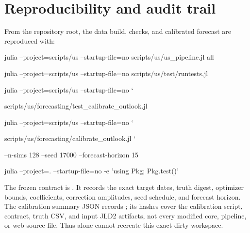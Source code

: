 \documentclass[10pt]{article}
\begin{document}
\section{Reproducibility and audit trail}

From the repository root, the data build, checks, and calibrated forecast are
reproduced with:

\begin{tcolorbox}[colback=navy!3,colframe=navy!35,boxrule=0.5pt]
\small\ttfamily
julia --project=scripts/us --startup-file=no scripts/us/us\_pipeline.jl all\par
julia --project=scripts/us --startup-file=no scripts/us/test/runtests.jl\par
julia --project=scripts/us --startup-file=no \char`\\\par
\quad scripts/us/forecasting/test\_calibrate\_outlook.jl\par
julia --project=scripts/us --startup-file=no \char`\\\par
\quad scripts/us/forecasting/calibrate\_outlook.jl \char`\\\par
\quad --n-sims 128 --seed 17000 --forecast-horizon 15\par
julia --project=. --startup-file=no -e 'using Pkg; Pkg.test()'
\end{tcolorbox}

The frozen contract is . It records
the exact target dates, truth digest, optimizer bounds, coefficients,
correction amplitudes, seed schedule, and forecast horizon. The calibration
summary JSON records ; its hashes cover the
calibration script, contract, truth CSV, and input JLD2 artifacts, not every
modified core, pipeline, or web source file. Thus  alone cannot
recreate this exact dirty workspace.
\end{document}
